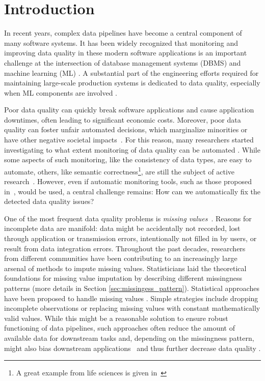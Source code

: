 \documentclass[utf8]{frontiersSCNS} %
\begin{document}
\section{Introduction}
\label{sec:introduction}

In recent years, complex data pipelines have become a central component of many software systems. It has been widely recognized that monitoring and improving data quality in these modern software applications is an important challenge at the intersection of database management systems (DBMS) and machine learning (ML) \citep{Schelter2015,Abedjan2018}. A substantial part of the engineering efforts required for maintaining large-scale production systems is dedicated to data quality, especially when ML components are involved \citep{Sculley2015,Bose2017b}.

Poor data quality can quickly break software applications and cause application downtimes, often leading to significant economic costs. Moreover, poor data quality can foster unfair automated decisions, which marginalize minorities or have other negative societal impacts~\citep{Stoyanovich2020,Yang2020,Bender2021}. For this reason, many researchers started investigating to what extent monitoring of data quality can be automated \citep{Abedjan2016,Baylor2017,Schelter2018,rukat2020towards}. While some aspects of such monitoring, like the consistency of data types, are easy to automate, others, like semantic correctness\footnote{A great example from life sciences is given in~\citep{Ziemann2016}}, are still the subject of active research~\citep{biessmann2021automated}. However, even if automatic monitoring tools, such as those proposed in~\cite{Schelter2017}, would be used, a central challenge remains: How can we automatically fix the detected data quality issues?

One of the most frequent data quality problems is \emph{missing values}~\citep{Kumar}. Reasons for incomplete data are manifold: data might be accidentally not recorded, lost through application or transmission errors, intentionally not filled in by users, or result from data integration errors.
%
Throughout the past decades, researchers from different communities have been contributing to an increasingly large arsenal of methods to impute missing values. Statisticians laid the theoretical foundations for missing value imputation \citep{Rubin} by describing different missingness patterns (more details in Section \ref{sec:missingess_pattern}). Statistical approaches have been proposed to handle missing values \citep{Graham}. Simple strategies include dropping incomplete observations or replacing missing values with constant mathematically valid values. While this might be a reasonable solution to ensure robust functioning of data pipelines, such approaches often reduce the amount of available data for downstream tasks and, depending on the missingness pattern, might also bias downstream applications~\citep{Stoyanovich2020,Yang2020} and thus further decrease data quality \citep{Little, Graham}.
\end{document}
